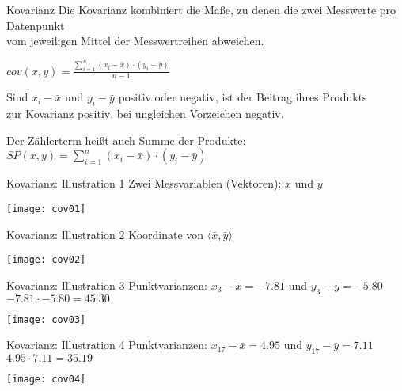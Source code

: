 \begin{frame}
  {Kovarianz}
  Die Kovarianz kombiniert die Maße, zu denen die \alert{zwei Messwerte} pro Datenpunkt\\
  vom \alert{jeweiligen Mittel der Messwertreihen} abweichen.\\
  \begin{center}
    \alert{$cov(x,y)=\frac{\sum\limits_{i=1}^{n}(x_i-\bar{x})\cdot(y_i-\bar{y})}{n-1}$}\\
  \end{center}
  \pause
  Sind $x_i-\bar{x}$ und $y_i-\bar{y}$ positiv oder negativ, ist der Beitrag ihres Produkts\\
  zur Kovarianz positiv, bei ungleichen Vorzeichen negativ.
  \pause
  \begin{center}
    Der Zählerterm heißt auch \alert{Summe der Produkte}:\\
    $SP(x,y)=\sum\limits_{i=1}^{n}(x_i-\bar{x})\cdot(y_i-\bar{y})$
  \end{center}
\end{frame}


\begin{frame}
  {Kovarianz: Illustration 1}
  Zwei Messvariablen (Vektoren): $x$ und $y$
  \begin{center}
    \texttt{[image: cov01]}
  \end{center}
\end{frame}


\begin{frame}
  {Kovarianz: Illustration 2}
  Koordinate von $\langle\bar{x},\bar{y}\rangle$
  \begin{center}
    \texttt{[image: cov02]}
  \end{center}
\end{frame}


\begin{frame}
  {Kovarianz: Illustration 3}
  Punktvarianzen: $x_3-\bar{x}=-7.81$ und $y_3-\bar{y}=-5.80$\\
  \alert{$-7.81\cdot-5.80=45.30$}
  \begin{center}
    \texttt{[image: cov03]}
  \end{center}
\end{frame}


\begin{frame}
  {Kovarianz: Illustration 4}
  Punktvarianzen: $x_{17}-\bar{x}=4.95$ und $y_{17}-\bar{y}=7.11$\\
  \alert{$4.95\cdot7.11=35.19$}
  \begin{center}
    \texttt{[image: cov04]}
  \end{center}
\end{frame}



